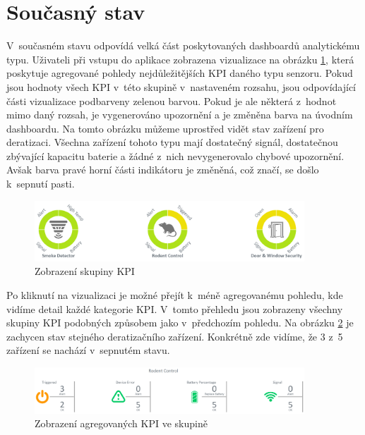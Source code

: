 \section{Současný stav}
V~současném stavu odpovídá velká část poskytovaných dashboardů analytickému typu. Uživateli při vstupu do aplikace zobrazena vizualizace na obrázku \ref{l1}, která poskytuje agregované pohledy nejdůležitějších KPI daného typu senzoru. Pokud jsou hodnoty všech KPI v~této skupině v~nastaveném rozsahu, jsou odpovídající části vizualizace podbarveny zelenou barvou. Pokud je ale některá z~hodnot mimo daný rozsah, je vygenerováno upozornění a je změněna barva na úvodním dashboardu. Na tomto obrázku můžeme uprostřed vidět stav zařízení pro deratizaci. Všechna zařízení tohoto typu mají dostatečný signál, dostatečnou zbývající kapacitu baterie a žádné z~nich nevygenerovalo chybové upozornění. Avšak barva pravé horní části indikátoru je změněná, což značí, se došlo k~sepnutí pasti.

\begin{figure}[H]
\label{l1}
\begin{center}
    \includegraphics[width=0.9\textwidth]{obrazky-figures/l1.png}
\end{center}
\caption{Zobrazení skupiny KPI}
\end{figure}

Po kliknutí na vizualizaci je možné přejít k~méně agregovanému pohledu, kde vidíme detail každé kategorie KPI. V~tomto přehledu jsou zobrazeny všechny skupiny KPI podobných způsobem jako v~předchozím pohledu. Na obrázku \ref{l2} je zachycen stav stejného deratizačního zařízení. Konkrétně zde vidíme, že 3 z~5 zařízení se nachází v~sepnutém stavu.

\begin{figure}[H]
\label{l2}
\begin{center}
    \includegraphics[width=0.9\textwidth]{obrazky-figures/l2.png}
\end{center}
\caption{Zobrazení agregovaných KPI ve skupině}
\end{figure}

